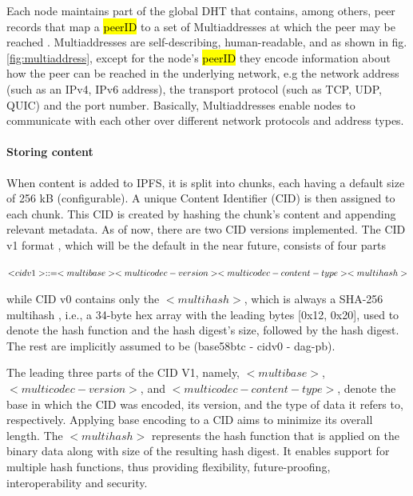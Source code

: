 Each node maintains part of the global DHT that contains, among others, peer records that map a \hl{peerID} to a set of Multiaddresses at which the peer may be reached \citep{schmahmann_2020}. Multiaddresses \citep{multiaddress_2023} are self-describing, human-readable, and as shown in fig. \ref{fig:multiaddress}, except for the node's \hl{peerID} they encode information about how the peer can be reached in the underlying network, e.g the network address (such as an IPv4, IPv6 address), the transport protocol (such as TCP, UDP, QUIC) and the port number. Basically, Multiaddresses enable nodes to communicate with each other over different network protocols and address types.

\paragraph{Storing content}\label{par:storing_ipfs}
When content is added to IPFS, it is split into chunks, each having a default size of 256 kB (configurable). A unique Content Identifier (CID) is then assigned to each chunk. This CID is created by hashing the chunk's content and appending relevant metadata. As of now, there are two CID versions implemented. The CID v1 format \citep{multiformat}, which will be the default in the near future, consists of four parts


\begin{flushleft}
\centering
$\textsc <cidv1> ::= <multibase><multicodec-version><multicodec-content-type><multihash>$
\end{flushleft}

while CID v0 contains only the \(\scriptstyle <multihash>\), which is always a SHA-256 multihash \citep{multiformat}, i.e., a 34-byte hex array with the leading bytes [0x12, 0x20], used to denote the hash function and the hash digest’s size, followed by the hash digest. The rest are implicitly assumed to be (base58btc - cidv0 - dag-pb).

The leading three parts of the CID V1, namely, \(\scriptstyle <multibase>\), \(\scriptstyle <multicodec-version>\), and \(\scriptstyle <multicodec-content-type>\), denote the base in which the CID was encoded, its version, and the type of data it refers to, respectively. Applying base encoding to a CID aims to minimize its overall length. The \(\scriptstyle <multihash>\) represents the hash function that is applied on the binary data along with size of the resulting hash digest. It enables support for multiple hash functions, thus providing flexibility, future-proofing, interoperability and security. %

